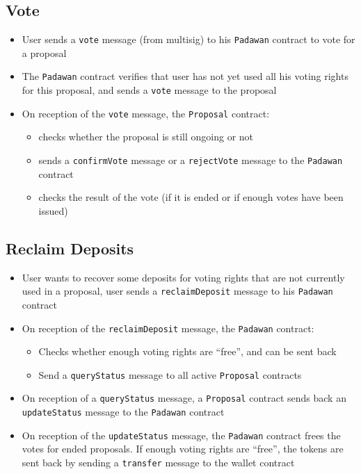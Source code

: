\subsection{Vote}

\begin{itemize}
\item User sends a {\tt vote} message (from multisig) to his {\tt Padawan} contract to vote for a proposal
\item The {\tt Padawan} contract verifies that user has not yet used all his voting rights for this proposal, and sends a {\tt vote} message to the proposal
\item On reception of the {\tt vote} message, the {\tt Proposal} contract:
\begin{itemize}
\item checks whether the proposal is still ongoing or not
\item  sends a {\tt confirmVote} message or a {\tt rejectVote} message to the {\tt Padawan} contract
\item checks the result of the vote (if it is ended or if enough votes have been issued)
\end{itemize}
\end{itemize}

\subsection{Reclaim Deposits}

\begin{itemize}
\item User wants to recover some deposits for voting rights that are not currently used in a proposal, user sends a {\tt reclaimDeposit} message to his {\tt Padawan} contract
\item On reception of the {\tt reclaimDeposit} message, the {\tt Padawan} contract:
\begin{itemize}
\item Checks whether enough voting rights are ``free'', and can be sent back
\item Send a {\tt queryStatus} message to all active {\tt Proposal} contracts
\end{itemize}
\item On reception of a {\tt queryStatus} message, a {\tt Proposal} contract sends back an {\tt updateStatus} message to the {\tt Padawan} contract
\item On reception of the {\tt updateStatus} message, the {\tt Padawan} contract frees the votes for ended proposals. If enough voting rights are ``free'', the tokens are sent back by sending a {\tt transfer} message to the wallet contract
\end{itemize}

